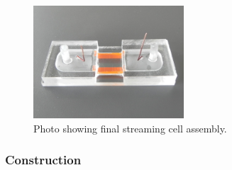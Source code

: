     \begin{figure}[p]
      \centering
      \includegraphics[width=0.5\textwidth]{content/pt1/01-PowerHarvesting/graphics/Photo_streamingPotential_Assembly_Step3.JPG}
      \caption{\label{fig:Photo_streamingPotential_Assembly_Step3}Photo showing final streaming cell assembly.}
    \end{figure}


    \subsubsection*{Construction}

